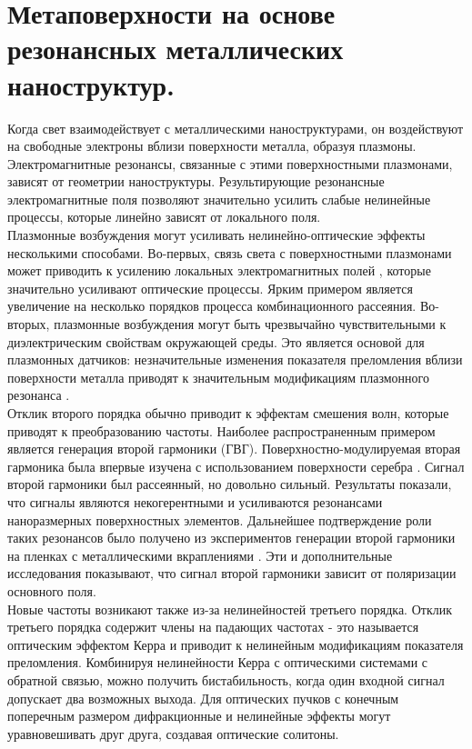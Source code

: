 \section{Метаповерхности на основе резонансных металлических наноструктур.}
\hspace*{2mm}
Когда свет взаимодействует с металлическими наноструктурами, он  воздействуют на свободные электроны вблизи поверхности металла, образуя плазмоны. Электромагнитные резонансы, связанные с этими поверхностными плазмонами, зависят от геометрии наноструктуры. Результирующие резонансные электромагнитные поля позволяют значительно усилить слабые нелинейные процессы, которые линейно зависят от локального поля.
\\
\hspace*{2mm}
Плазмонные возбуждения могут усиливать нелинейно-оптические эффекты несколькими способами. Во-первых, связь света с поверхностными плазмонами может приводить к усилению локальных электромагнитных полей \cite{novotny2011antennas}, которые значительно усиливают оптические процессы. Ярким примером является увеличение на несколько порядков процесса  комбинационного рассеяния. Во-вторых, плазмонные возбуждения могут быть чрезвычайно чувствительными к диэлектрическим свойствам окружающей среды. Это является основой для плазмонных датчиков: незначительные изменения показателя преломления вблизи поверхности металла приводят к значительным модификациям плазмонного резонанса \cite{homola2008surface}.
\\
\hspace*{2mm}
Отклик второго порядка обычно приводит к эффектам смешения волн, которые приводят к преобразованию частоты. Наиболее распространенным примером является генерация второй гармоники (ГВГ). Поверхностно-модулируемая вторая гармоника была впервые изучена с использованием поверхности серебра \cite{chen1981surface}. Сигнал второй гармоники был рассеянный, но довольно сильный. Результаты показали, что сигналы являются некогерентными и усиливаются резонансами наноразмерных поверхностных элементов. Дальнейшее подтверждение роли таких резонансов было получено из экспериментов генерации второй гармоники на пленках с металлическими вкраплениями \cite{wokaun1981surface}. Эти и дополнительные исследования показывают, что сигнал второй гармоники зависит от поляризации основного поля.
\\
Новые частоты возникают также из-за нелинейностей третьего порядка. Отклик третьего порядка содержит члены на падающих частотах - это называется оптическим эффектом Керра и приводит к нелинейным модификациям показателя преломления. Комбинируя нелинейности Керра с оптическими системами с обратной связью, можно получить бистабильность, когда один входной сигнал допускает два возможных выхода. Для оптических пучков с конечным поперечным размером дифракционные и нелинейные эффекты могут уравновешивать друг друга, создавая оптические солитоны.

